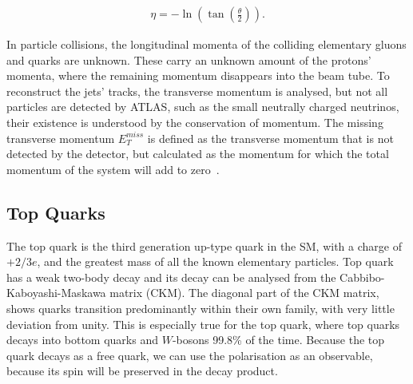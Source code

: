 \documentclass[12pt,a4paper]{article}
\numberwithin{equation}{section}
\begin{document}
\begin{align}
\label{eq:pseudorapidity}
\eta = -\ln({\tan\left(\frac{\theta}{2}\right)}).
\end{align}

In particle collisions, the longitudinal momenta of the colliding elementary
gluons and quarks are unknown. These carry an unknown amount of the protons'
momenta, where the remaining momentum disappears into the beam tube. To
reconstruct the jets' tracks, the transverse momentum is analysed, but not all
particles are detected by ATLAS, such as the small neutrally charged neutrinos,
their existence is understood by the conservation of momentum. The missing
transverse momentum $E_T^{miss}$ is defined as the transverse momentum that is
not detected by the detector, but calculated as the momentum for which the total
momentum of the system will add to zero~\cite{xabier}.

\subsection{Top Quarks}
The top quark is the third generation up-type quark in the SM, with a charge of
$+2/3 e$, and the greatest mass of all the known elementary particles. Top quark
has a weak two-body decay and its decay can be analysed from the
Cabbibo-Kaboyashi-Maskawa matrix (CKM). The diagonal part of the CKM matrix,
shows quarks transition predominantly within their own family, with very little
deviation from unity. This is especially true for the top quark, where top
quarks decays into bottom quarks and $W$-bosons 99.8\% of the time. Because the
top quark decays as a free quark, we can use the polarisation as an observable,
because its spin will be preserved in the decay product.\\
\end{document}
